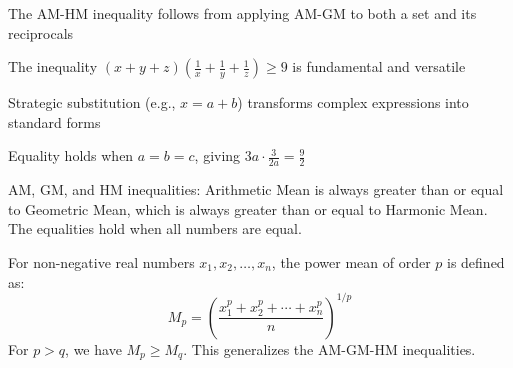 \begin{takeaways}
\item The AM-HM inequality follows from applying AM-GM to both a set and its reciprocals
\item The inequality $(x+y+z)(\frac{1}{x}+\frac{1}{y}+\frac{1}{z}) \ge 9$ is fundamental and versatile
\item Strategic substitution (e.g., $x=a+b$) transforms complex expressions into standard forms
\item Equality holds when $a=b=c$, giving $3a \cdot \frac{3}{2a} = \frac{9}{2}$
\item AM, GM, and HM inequalities: Arithmetic Mean is always greater than or equal to Geometric Mean, which is always greater than or equal to Harmonic Mean. The equalities hold when all numbers are equal.
\item For non-negative real numbers $x_1, x_2, \ldots, x_n$, the power mean of order $p$ is defined as:
\[M_p = \left( \frac{x_1^p + x_2^p + \cdots + x_n^p}{n} \right)^{1/p}\]
For $p > q$, we have $M_p \geq M_q$. This generalizes the AM-GM-HM inequalities.
\end{takeaways}
